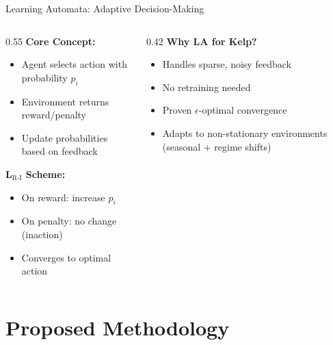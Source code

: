 \documentclass[10pt,xcolor={table,dvipsnames}]{beamer}
\begin{document}
\begin{frame}{Learning Automata: Adaptive Decision-Making}

\begin{columns}[T]
\begin{column}{0.55\textwidth}
\textbf{Core Concept:}
\begin{itemize}
  \item Agent selects action with probability $p_i$
  \item Environment returns reward/penalty
  \item Update probabilities based on feedback
\end{itemize}

\vspace{0.3em}
\textbf{L$_{\text{R-I}}$ Scheme:}
\begin{itemize}
  \item On reward: increase $p_i$
  \item On penalty: no change (inaction)
  \item Converges to optimal action
\end{itemize}
\end{column}

\begin{column}{0.42\textwidth}
\textbf{Why LA for Kelp?}
\begin{itemize}
  \item Handles sparse, noisy feedback
  \item No retraining needed
  \item Proven $\epsilon$-optimal convergence
  \item Adapts to non-stationary environments (seasonal + regime shifts)
\end{itemize}
\end{column}
\end{columns}

\end{frame}

\section{Proposed Methodology}
\end{document}
